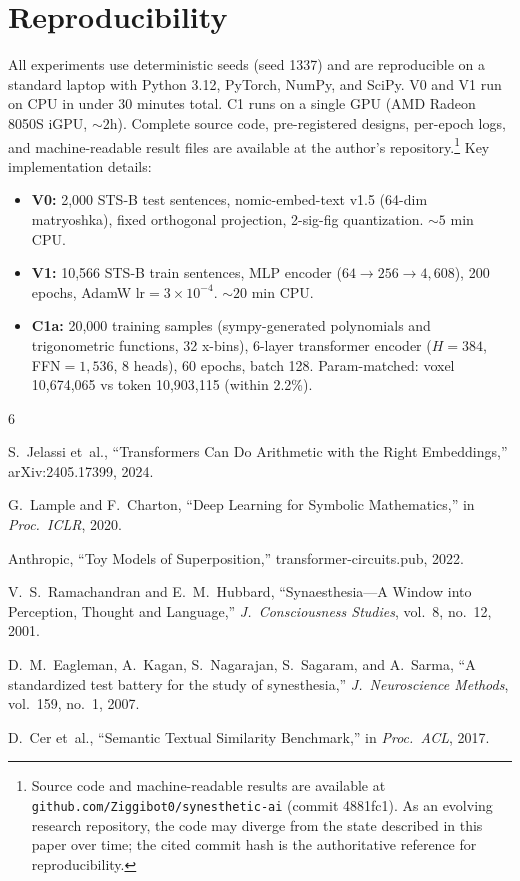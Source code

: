 \documentclass[11pt,a4paper]{article}
\begin{document}
\section{Reproducibility}

All experiments use deterministic seeds (seed 1337) and are reproducible on
a standard laptop with Python 3.12, PyTorch, NumPy, and SciPy. V0 and V1
run on CPU in under 30 minutes total. C1 runs on a single GPU
(AMD Radeon 8050S iGPU, ${\sim}2$h). Complete source code, pre-registered
designs, per-epoch logs, and machine-readable result files are available
at the author's repository.\footnote{Source code and machine-readable
results are available at \texttt{github.com/Ziggibot0/synesthetic-ai}
(commit 4881fc1). As an evolving research repository, the code may
diverge from the state described in this paper over time; the cited
commit hash is the authoritative reference for reproducibility.} Key implementation details:

\begin{itemize}
\item \textbf{V0:} 2,000 STS-B test sentences, nomic-embed-text v1.5
(64-dim matryoshka), fixed orthogonal projection, 2-sig-fig quantization.
${\sim}5$ min CPU.
\item \textbf{V1:} 10,566 STS-B train sentences, MLP encoder
($64 \to 256 \to 4{,}608$), 200 epochs, AdamW lr$=3\times10^{-4}$.
${\sim}20$ min CPU.
\item \textbf{C1a:} 20,000 training samples (sympy-generated polynomials
and trigonometric functions, 32 x-bins), 6-layer transformer encoder
($H{=}384$, FFN$=1{,}536$, 8 heads), 60 epochs, batch 128.
Param-matched: voxel 10,674,065 vs token 10,903,115 (within 2.2\%).
\end{itemize}


\begin{thebibliography}{6}

S.~Jelassi et~al., ``Transformers Can Do Arithmetic with the Right Embeddings,''
arXiv:2405.17399, 2024.

G.~Lample and F.~Charton, ``Deep Learning for Symbolic Mathematics,''
in \textit{Proc.\ ICLR}, 2020.

Anthropic, ``Toy Models of Superposition,''
transformer-circuits.pub, 2022.

V.~S.~Ramachandran and E.~M.~Hubbard, ``Synaesthesia---A Window into Perception, Thought and Language,''
\textit{J.\ Consciousness Studies}, vol.~8, no.~12, 2001.

D.~M.~Eagleman, A.~Kagan, S.~Nagarajan, S.~Sagaram, and A.~Sarma, ``A standardized test battery for the study of synesthesia,''
\textit{J.\ Neuroscience Methods}, vol.~159, no.~1, 2007.

D.~Cer et~al., ``Semantic Textual Similarity Benchmark,''
in \textit{Proc.\ ACL}, 2017.

\end{thebibliography}
\end{document}
